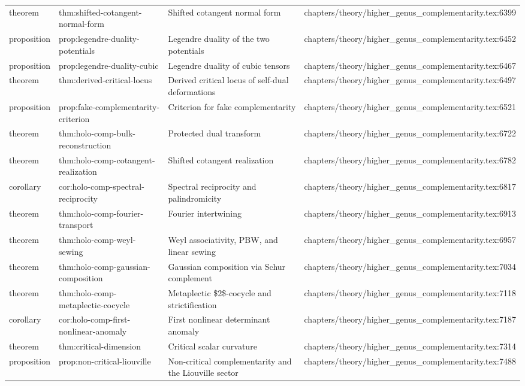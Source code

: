 \documentclass[11pt]{article}
\begin{document}
\begin{longtable}{L{0.10\textwidth}L{0.26\textwidth}L{0.42\textwidth}L{0.22\textwidth}}
theorem & thm:shifted-cotangent-normal-form & Shifted cotangent normal form & chapters/theory/higher\_genus\_complementarity.tex:6399\\
proposition & prop:legendre-duality-potentials & Legendre duality of the two potentials & chapters/theory/higher\_genus\_complementarity.tex:6452\\
proposition & prop:legendre-duality-cubic & Legendre duality of cubic tensors & chapters/theory/higher\_genus\_complementarity.tex:6467\\
theorem & thm:derived-critical-locus & Derived critical locus of self-dual deformations & chapters/theory/higher\_genus\_complementarity.tex:6497\\
proposition & prop:fake-complementarity-criterion & Criterion for fake complementarity & chapters/theory/higher\_genus\_complementarity.tex:6521\\
theorem & thm:holo-comp-bulk-reconstruction & Protected dual transform & chapters/theory/higher\_genus\_complementarity.tex:6722\\
theorem & thm:holo-comp-cotangent-realization & Shifted cotangent realization & chapters/theory/higher\_genus\_complementarity.tex:6782\\
corollary & cor:holo-comp-spectral-reciprocity & Spectral reciprocity and palindromicity & chapters/theory/higher\_genus\_complementarity.tex:6817\\
theorem & thm:holo-comp-fourier-transport & Fourier intertwining & chapters/theory/higher\_genus\_complementarity.tex:6913\\
theorem & thm:holo-comp-weyl-sewing & Weyl associativity, PBW, and linear sewing & chapters/theory/higher\_genus\_complementarity.tex:6957\\
theorem & thm:holo-comp-gaussian-composition & Gaussian composition via Schur complement & chapters/theory/higher\_genus\_complementarity.tex:7034\\
theorem & thm:holo-comp-metaplectic-cocycle & Metaplectic \$2\$-cocycle and strictification & chapters/theory/higher\_genus\_complementarity.tex:7118\\
corollary & cor:holo-comp-first-nonlinear-anomaly & First nonlinear determinant anomaly & chapters/theory/higher\_genus\_complementarity.tex:7187\\
theorem & thm:critical-dimension & Critical scalar curvature & chapters/theory/higher\_genus\_complementarity.tex:7314\\
proposition & prop:non-critical-liouville & Non-critical complementarity and the Liouville sector & chapters/theory/higher\_genus\_complementarity.tex:7488\\

\end{longtable}
\end{document}
